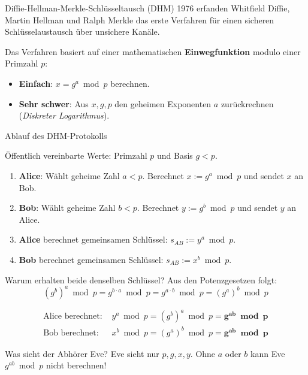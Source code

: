 \begin{frame}{Diffie-Hellman-Merkle-Schlüsseltausch (DHM)}
	1976 erfanden Whitfield Diffie, Martin Hellman und Ralph Merkle das erste Verfahren für einen sicheren Schlüsselaustausch über unsichere Kanäle.
	
	\begin{myidea}
		Das Verfahren basiert auf einer mathematischen \textbf{Einwegfunktion} modulo einer Primzahl $p$:
		\begin{itemize}[<+->]
			\item \textbf{Einfach}: $x = g^a \bmod p$ berechnen.
			\item \textbf{Sehr schwer}: Aus $x, g, p$ den geheimen Exponenten $a$ zurückrechnen (\emph{Diskreter Logarithmus}).
		\end{itemize}
	\end{myidea}
\end{frame}

\begin{frame}{Ablauf des DHM-Protokolls}
	\begin{myprocedure}
		{\small
		Öffentlich vereinbarte Werte: Primzahl $p$ und Basis $g < p$.
		
		\begin{enumerate}[<+->]
			\item \textbf{Alice}: Wählt geheime Zahl $a < p$. Berechnet $x := g^a \bmod p$ und sendet $x$ an Bob.
			\item \textbf{Bob}: Wählt geheime Zahl $b < p$. Berechnet $y := g^b \bmod p$ und sendet $y$ an Alice.
			\item \textbf{Alice} berechnet gemeinsamen Schlüssel:
			      $s_{AB} := y^a \bmod p$.
			\item \textbf{Bob} berechnet gemeinsamen Schlüssel:
			      $s_{AB} := x^b \bmod p$.
		\end{enumerate}
		}
	\end{myprocedure}
\end{frame}

\begin{frame}{Warum erhalten beide denselben Schlüssel?}
	Aus den Potenzgesetzen folgt:
	\[ (g^b)^a \bmod p = g^{b \cdot a} \bmod p = g^{a \cdot b} \bmod p = (g^a)^b \bmod p \]
	
	\pause
	\begin{align*}
		\text{Alice berechnet: } & y^a \bmod p = (g^b)^a \bmod p = \mathbf{g^{ab} \bmod p} \\
		\text{Bob berechnet: }   & x^b \bmod p = (g^a)^b \bmod p = \mathbf{g^{ab} \bmod p}
	\end{align*}
	
	\pause
	\begin{alertblock}{Was sieht der Abhörer Eve?}
		Eve sieht nur $p, g, x, y$. Ohne $a$ oder $b$ kann Eve $g^{ab} \bmod p$ nicht berechnen!
	\end{alertblock}
\end{frame}

